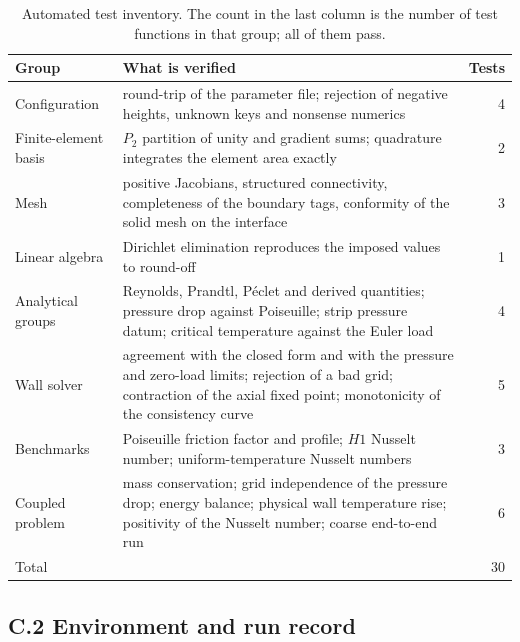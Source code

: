 \documentclass[11pt,a4paper]{article}
\begin{document}
\begin{table}[htbp]
\centering
\caption{Automated test inventory. The count in the last column is the number
of test functions in that group; all of them pass.}
\label{tab:tests}
\small
\begin{tabular}{@{}p{3.4cm}p{9.2cm}r@{}}
\toprule
Group & What is verified & Tests\\
\midrule
Configuration & round-trip of the parameter file; rejection of negative heights, unknown keys and nonsense numerics & 4\\
Finite-element basis & $P_2$ partition of unity and gradient sums; quadrature integrates the element area exactly & 2\\
Mesh & positive Jacobians, structured connectivity, completeness of the boundary tags, conformity of the solid mesh on the interface & 3\\
Linear algebra & Dirichlet elimination reproduces the imposed values to round-off & 1\\
Analytical groups & Reynolds, Prandtl, P\'eclet and derived quantities; pressure drop against Poiseuille; strip pressure datum; critical temperature against the Euler load & 4\\
Wall solver & agreement with the closed form and with the pressure and zero-load limits; rejection of a bad grid; contraction of the axial fixed point; monotonicity of the consistency curve & 5\\
Benchmarks & Poiseuille friction factor and profile; $H1$ Nusselt number; uniform-temperature Nusselt numbers & 3\\
Coupled problem & mass conservation; grid independence of the pressure drop; energy balance; physical wall temperature rise; positivity of the Nusselt number; coarse end-to-end run & 6\\
\midrule
Total & & 30\\
\bottomrule
\end{tabular}
\end{table}

\subsection*{C.2 Environment and run record}
\end{document}
